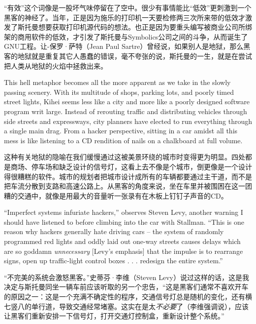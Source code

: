 \ifdefined\chs
``有效''这个词像是一股坏气味停留在了空中。很少有事情能比``低效''更刺激到一个黑客的神经了。当年，正是因为施乐的打印机一天要检修两三次所来带的低效才激发了斯托曼想要获取打印机源代码的想法。也正是因为要重头编写被商业公司所绑架的商用软件的低效，才引发了斯托曼与Symbolics公司之间的斗争，从而诞生了GNU工程。让-保罗·萨特（Jean Paul Sartre）曾经说，如果别人是地狱，那么黑客的地狱就是重复其它人愚蠢的错误，毫不夸张的说，斯托曼的一生，就是在尝试把人类从地狱的火焰中拯救出来。
\fi

\ifdefined\eng
This hell metaphor becomes all the more apparent as we take in the slowly passing scenery. With its multitude of shops, parking lots, and poorly timed street lights, Kihei seems less like a city and more like a poorly designed software program writ large. Instead of rerouting traffic and distributing vehicles through side streets and expressways, city planners have elected to run everything through a single main drag. From a hacker perspective, sitting in a car amidst all this mess is like listening to a CD rendition of nails on a chalkboard at full volume.
\fi

\ifdefined\chs
这种有关地狱的隐喻在我们缓慢通过这被美景环绕的城市时变得更为明显。四处都是商场、停车场和缺乏设计的信号灯，这看上去不像是个城市，倒更像是一个设计得很糟糕的软件。城市的规划者把城市设计成所有的车辆都要通过主干道，而不是把车流分散到支路和高速公路上。从黑客的角度来说，坐在车里并被围困在这一团糟的交通中，就像是用最大的音量听一张录有在木板上钉钉子声音的CD。
\fi

\ifdefined\eng
``Imperfect systems infuriate hackers,'' observes Steven Levy, another warning I should have listened to before climbing into the car with Stallman. ``This is one reason why hackers generally hate driving cars -- the system of randomly programmed red lights and oddly laid out one-way streets causes delays which are so goddamn \textit{unnecessary} [Levy's emphasis] that the impulse is to rearrange signs, open up traffic-light control boxes . . . redesign the entire system.''
\fi

\ifdefined\chs
``不完美的系统会激怒黑客。''史蒂芬·李维（Steven Levy）说过这样的话，这是我决定与斯托曼同坐一辆车前应该听取的另一个忠告，``这是黑客们通常不喜欢开车的原因之一：这是一个充满不确定性的程序，交通信号灯总是随机的变化，还有横七竖八的单行道，导致交通经常堵塞。这实在是太\textit{不必要}了（李维强调说），应该让黑客们重新安排一下信号灯，打开交通灯控制盒，重新设计整个系统。'' 
\fi

